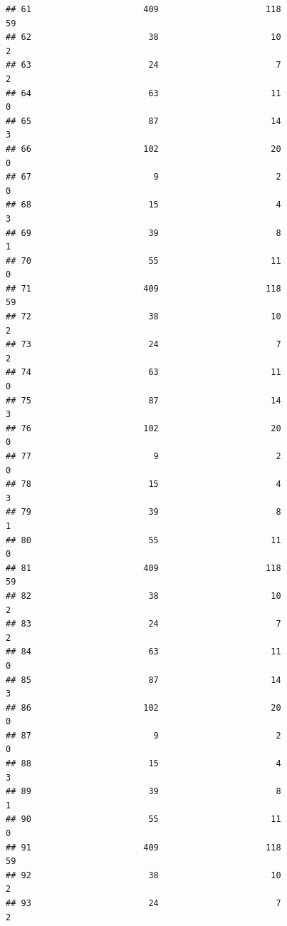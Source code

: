 \documentclass[
]{article}
\begin{document}
\begin{verbatim}
## 61                      409                     118                       59
## 62                       38                      10                        2
## 63                       24                       7                        2
## 64                       63                      11                        0
## 65                       87                      14                        3
## 66                      102                      20                        0
## 67                        9                       2                        0
## 68                       15                       4                        3
## 69                       39                       8                        1
## 70                       55                      11                        0
## 71                      409                     118                       59
## 72                       38                      10                        2
## 73                       24                       7                        2
## 74                       63                      11                        0
## 75                       87                      14                        3
## 76                      102                      20                        0
## 77                        9                       2                        0
## 78                       15                       4                        3
## 79                       39                       8                        1
## 80                       55                      11                        0
## 81                      409                     118                       59
## 82                       38                      10                        2
## 83                       24                       7                        2
## 84                       63                      11                        0
## 85                       87                      14                        3
## 86                      102                      20                        0
## 87                        9                       2                        0
## 88                       15                       4                        3
## 89                       39                       8                        1
## 90                       55                      11                        0
## 91                      409                     118                       59
## 92                       38                      10                        2
## 93                       24                       7                        2

\end{verbatim}
\end{document}
